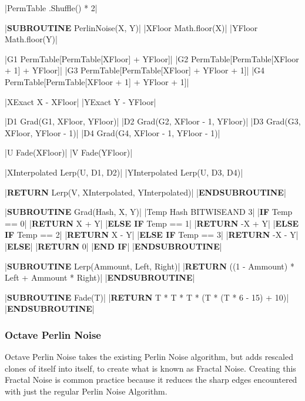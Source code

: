 \begin{flushleft}
                \vspace{0.2cm}
                \begin{pseudocode}
|PermTable \leftarrow [1 \rightarrow 255].Shuffle() * 2|

|\textbf{SUBROUTINE} PerlinNoise(X, Y)|
    |XFloor \leftarrow Math.floor(X)|
    |YFloor \leftarrow Math.floor(Y)|

    |G1 \leftarrow PermTable[PermTable[XFloor] + YFloor]|
    |G2 \leftarrow PermTable[PermTable[XFloor + 1] + YFloor]|
    |G3 \leftarrow PermTable[PermTable[XFloor] + YFloor + 1]|
    |G4 \leftarrow PermTable[PermTable[XFloor + 1] + YFloor + 1]|

    |XExact \leftarrow X - XFloor|
    |YExact \leftarrow Y - YFloor|

    |D1 \leftarrow Grad(G1, XFloor, YFloor)|
    |D2 \leftarrow Grad(G2, XFloor - 1, YFloor)|
    |D3 \leftarrow Grad(G3, XFloor, YFloor - 1)|
    |D4 \leftarrow Grad(G4, XFloor - 1, YFloor - 1)|

    |U \leftarrow Fade(XFloor)|
    |V \leftarrow Fade(YFloor)|

    |XInterpolated \leftarrow Lerp(U, D1, D2)|
    |YInterpolated \leftarrow Lerp(U, D3, D4)|

    |\textbf{RETURN} Lerp(V, XInterpolated, YInterpolated)|
|\textbf{ENDSUBROUTINE}|

|\textbf{SUBROUTINE} Grad(Hash, X, Y)|
    |Temp \leftarrow Hash BITWISEAND 3|
    |\textbf{IF} Temp == 0|
        |\textbf{RETURN} X + Y|
    |\textbf{ELSE IF} Temp == 1|
        |\textbf{RETURN} -X + Y|
    |\textbf{ELSE IF} Temp == 2|
        |\textbf{RETURN} X - Y|
    |\textbf{ELSE IF} Temp == 3|
        |\textbf{RETURN} -X - Y|
    |\textbf{ELSE}|
        |\textbf{RETURN} 0|
    |\textbf{END IF}|
|\textbf{ENDSUBROUTINE}|

|\textbf{SUBROUTINE} Lerp(Ammount, Left, Right)|
    |\textbf{RETURN} ((1 - Ammount) * Left + Ammount * Right)|
|\textbf{ENDSUBROUTINE}|

|\textbf{SUBROUTINE} Fade(T)|
    |\textbf{RETURN} T * T * T * (T * (T * 6 - 15) + 10)|
|\textbf{ENDSUBROUTINE}|
                \end{pseudocode}

                \vspace{0.5cm}
            \subsubsection{Octave Perlin Noise}
                Octave Perlin Noise takes the existing Perlin Noise algorithm, but adds rescaled clones of itself into itself, to create
                what is known as Fractal Noise. Creating this Fractal Noise is common practice because it reduces the sharp edges encountered
                with just the regular Perlin Noise Algorithm.


\end{flushleft}
